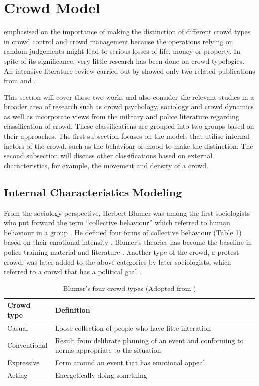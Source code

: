 \section{Crowd Model}
\textcite{Berlonghi1995} emphasised on the importance of making the distinction of different crowd types in crowd control and crowd management because the operations relying on random judgements might lead to serious losses of life, money or property. In spite of its significance, very little research has been done on crowd typologies. An intensive literature review carried out by \textcite{Challenger2009} showed only two related publications from \textcite{Momboisse1967} and \textcite{Berlonghi1995}.

This section will cover those two works and also consider the relevant studies in a broader area of research such as crowd psychology, sociology and crowd dynamics as well as incorporate views from the military and police literature regarding classification of crowd. These classifications are grouped into two groups based on their approaches. The first subsection focuses on the models that utilise internal factors of the crowd, such as the behaviour or mood to make the distinction. The second subsection will discuss other classifications based on external characteristics, for example, the movement and density of a crowd.

\subsection{Internal Characteristics Modeling}

From the sociology perspective, Herbert Blumer was among the first sociologists who put forward the term ``collective behaviour'' which referred to human behaviour in a group \parencite{Blumer1951}. He defined four forms of collective behaviour (Table \ref{table:blumerCrowdType}) based on their emotional intensity \parencite{Imhonopi2013}. Blumer’s theories has become the baseline in police training material and literature \parencite{Schweingruber2000}. Another type of the crowd, a protest crowd, was later added to the above categories by later sociologists, which referred to a crowd that has a political goal \parencite{Imhonopi2013}.

\begin{table}[!htbp]
	\caption{Blumer's four crowd types (Adopted from \textcite{Imhonopi2013})}
	\label{table:blumerCrowdType}
	\centering
	\begin{tabular}{|l|p{10cm}|}
		\hline
		\textbf{Crowd type} & \textbf{Definition} \\ \hline \hline
		Casual & Loose collection of people who have litte interation \\ \hline
		Conventional & Result from delibrate planning of an event and conforming to norms appropriate to the situation \\ \hline
		Expressive & Form around an event that has emotional appeal \\ \hline
		Acting & Energetically doing something \\ \hline
	\end{tabular}
\end{table}

